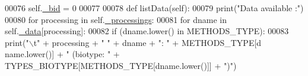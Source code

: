 \begin{DoxyCode}
00076         self.\hyperlink{classnavicom_1_1navicom_1_1NaviCom_a496d13fc4c8b73cef4f496b713d12b79}{_bid} = 0
00077 
00078     \textcolor{keyword}{def }listData(self):
00079         \textcolor{keywordflow}{print}(\textcolor{stringliteral}{"Data available :"})
00080         \textcolor{keywordflow}{for} processing \textcolor{keywordflow}{in} self.\hyperlink{classnavicom_1_1navicom_1_1NaviCom_ac6a14d6a91cd2f236eef71496a6f249c}{_processings}:
00081             \textcolor{keywordflow}{for} dname \textcolor{keywordflow}{in} self.\hyperlink{classnavicom_1_1navicom_1_1NaviCom_a407b2b5c30a5652ee85c4be54b3e6679}{_data}[processing]:
00082                 \textcolor{keywordflow}{if} (dname.lower() \textcolor{keywordflow}{in} METHODS\_TYPE):
00083                     \textcolor{keywordflow}{print}(\textcolor{stringliteral}{"\(\backslash\)t"} + processing + \textcolor{stringliteral}{" "} + dname + \textcolor{stringliteral}{": "} + METHODS\_TYPE[d
      name.lower()] + \textcolor{stringliteral}{" (biotype: "} + TYPES\_BIOTYPE[METHODS\_TYPE[dname.lower()]] + \textcolor{stringliteral}{")"})
      

\end{DoxyCode}
